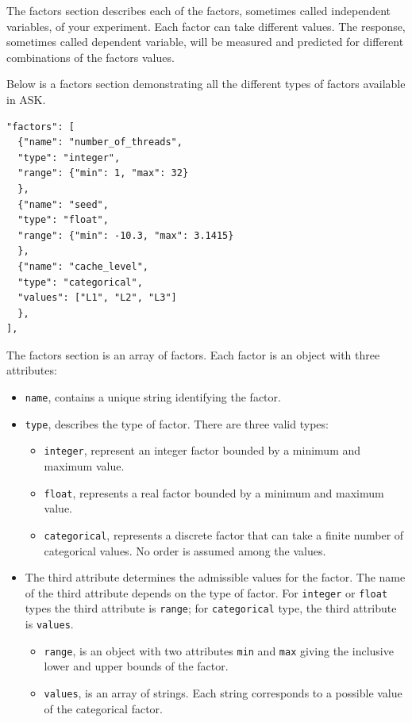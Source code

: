 The factors section describes each of the factors, sometimes called independent variables, of your experiment.
Each factor can take different values. The response, sometimes called dependent variable, will be measured and 
predicted for different combinations of the factors values.

Below is a factors section demonstrating all the different types of factors available in ASK.

\begin{verbatim}
"factors": [
  {"name": "number_of_threads",
  "type": "integer",
  "range": {"min": 1, "max": 32}
  },
  {"name": "seed",
  "type": "float",
  "range": {"min": -10.3, "max": 3.1415}
  },
  {"name": "cache_level",
  "type": "categorical",
  "values": ["L1", "L2", "L3"]
  },
],
\end{verbatim}

The factors section is an array of factors. Each factor is an object with three attributes:
\begin{itemize}
	\item \texttt{name}, contains a unique string identifying the factor.
	\item \texttt{type}, describes the type of factor. There are three valid types:
	\begin{itemize}
		\item \texttt{integer}, represent an integer factor bounded by a minimum and maximum value.
		\item \texttt{float}, represents a real factor bounded by a minimum and maximum value.
		\item \texttt{categorical}, represents a discrete factor that can take a finite number of categorical values. No order is assumed among the values.
	\end{itemize}
	\item The third attribute determines the admissible values for the factor. The name of the third attribute depends on the type of factor. For \texttt{integer} or \texttt{float} types the third attribute is \texttt{range}; for \texttt{categorical} type, the third attribute is \texttt{values}.
	\begin{itemize}
		\item \texttt{range}, is an object with two attributes \texttt{min} and \texttt{max} giving the inclusive lower and upper bounds of the factor.
		\item \texttt{values}, is an array of strings. Each string corresponds to a possible value of the categorical factor.
	\end{itemize}
\end{itemize}

